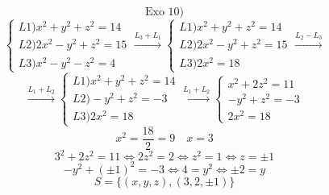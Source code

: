 \documentclass{article}
\begin{document}
\[
\text{Exo 10)}
\]
\[
\begin{cases}
L1) x^2 + y^2 + z^2 = 14 \\
L2) 2x^2 - y^2 + z^2 = 15 \\
L3) x^2 - y^2 - z^2 = 4
\end{cases}
\xrightarrow{L_3+L_1}
\begin{cases}
L1) x^2 + y^2 + z^2 = 14 \\
L2) 2x^2 - y^2 + z^2 = 15 \\
L3) 2x^2 = 18
\end{cases}
\xrightarrow{L_2-L_3}
\]
\[
\xrightarrow{L_1+L_2}
\begin{cases}
L1) x^2 + y^2 + z^2 = 14 \\
L2) -y^2 + z^2 = -3 \\
L3) 2x^2 = 18
\end{cases}
\xrightarrow{L_1+L_2}
\begin{cases}
x^2 + 2z^2 = 11 \\
-y^2 + z^2 = -3 \\
2x^2 = 18
\end{cases}
\]
\[
x^2 = \frac{18}{2} = 9 \quad x = 3
\]
\[
3^2 + 2z^2 = 11 \iff 2z^2 = 2 \iff z^2 = 1 \iff z = \pm 1
\]
\[
-y^2 + (\pm 1)^2 = -3 \iff 4 = y^2 \iff \pm 2 = y
\]
\[
S = \{(x,y,z), (3,2,\pm 1)\}
\]
\end{document}
